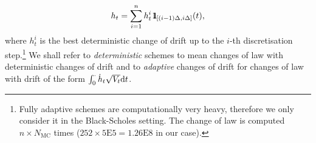 $$
h_t=\sum_{i=1}^{n} h^i_t \, \ind_{[(i-1)\Delta, i\Delta]}(t),
$$
where $h^i_t$ is the best deterministic change of drift up to the $i$-th discretisation step.\footnote{Fully adaptive schemes are  computationally very heavy, therefore we only consider it in the Black-Scholes setting. 
The change of law is computed $n \times N_{\text{MC}}$ times ($252 \times 5\mathrm{E}5 = 1.26\mathrm{E}8$ in our case).} %
We shall refer to \textit{deterministic} schemes
to mean changes of law with deterministic changes of drift and to \textit{adaptive} changes of drift 
for changes of law with drift of the form $\int_0^\cdot \dot{h}_t\sqrt{V_t}\mathrm{d} t$.

